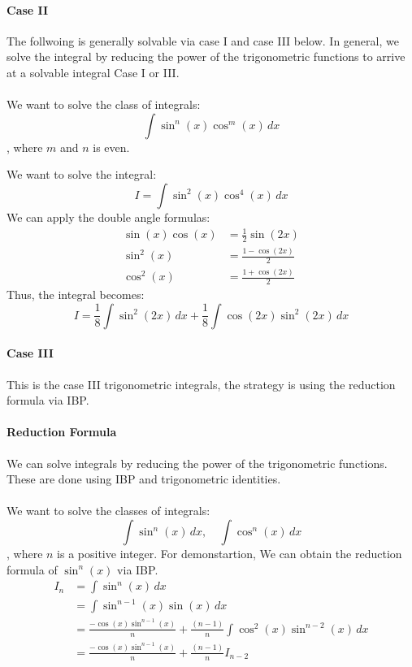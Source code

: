 \documentclass[11pt]{report}
\begin{document}
\paragraph{Case II} The follwoing is generally solvable via case I and case III below. In general, we solve the integral by reducing the power of the trigonometric functions to arrive at a solvable integral Case I or III.
\paragraph{} We want to solve the class of integrals:
\begin{equation} \int \sin^n(x) \cos^m(x) \, dx \end{equation}
, where $m$ and $n$ is even.
\begin{example}
We want to solve the integral:
$$ I = \int \sin^2(x) \cos^4(x) \, dx $$
We can apply the double angle formulas:
\begin{align}
    \sin(x)\cos(x) &= \frac{1}{2} \sin(2x) \\
    \sin^2(x) &= \frac{1 - \cos(2x)}{2} \\
    \cos^2(x) &= \frac{1 + \cos(2x)}{2}
\end{align}
Thus, the integral becomes:
$$ I = \frac{1}{8} \int \sin^2(2x) \, dx + \frac{1}{8} \int \cos(2x)\sin^2(2x) \, dx $$
\end{example}
\paragraph{Case III} This is the case III trigonometric integrals, the strategy is using the reduction formula via IBP.
\paragraph{Reduction Formula} We can solve integrals by reducing the power of the trigonometric functions. These are done using IBP and trigonometric identities.
\paragraph{} We want to solve the classes of integrals:
\begin{equation} 
    \int \sin^n(x) \, dx, \quad \int \cos^n(x) \, dx 
\end{equation}
, where $n$ is a positive integer. For demonstartion, We can obtain the reduction formula of $\sin^n(x)$ via IBP.
\begin{align}
    I_n &= \int \sin^n(x) \, dx \nonumber \\
    &= \int \sin^{n-1}(x) \sin(x) \, dx \nonumber \\
    &= \frac{-\cos(x) \sin^{n-1}(x)}{n} + \frac{(n-1)}{n} \int \cos^2(x) \sin^{n-2}(x) \, dx \nonumber \\
    &= \frac{-\cos(x) \sin^{n-1}(x)}{n} + \frac{(n-1)}{n} I_{n-2}
\end{align}
\end{document}
